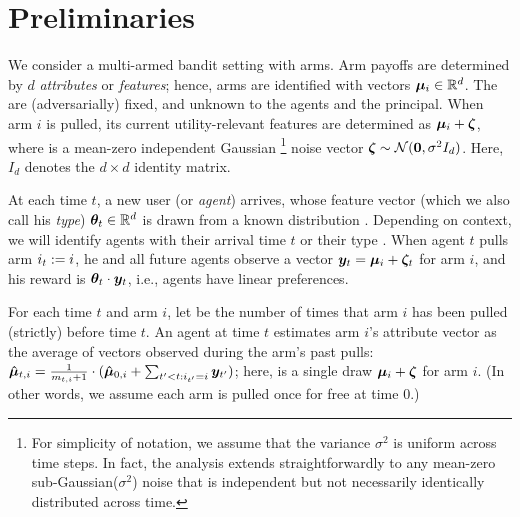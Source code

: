\section{Preliminaries}
\label{sec:prob}

We consider a multi-armed bandit setting with \ARMNUM arms.
Arm payoffs are determined by $d$ \emph{attributes} or \emph{features};
hence, arms are identified with vectors $\ArmV{i} \in \R^d$.
The  are (adversarially) fixed, and unknown to the agents
and the principal.
When arm $i$ is pulled, its current utility-relevant features are
determined as $\ArmV{i} + \NoiseV$, where \NoiseV is a mean-zero independent Gaussian%
\footnote{For simplicity of notation, we assume that the variance
  $\sigma^2$ is uniform across time steps.
In fact, the analysis extends straightforwardly to any
mean-zero sub-Gaussian($\sigma^2$) noise that is independent but not necessarily identically distributed across time.}
noise vector $\NoiseV \sim \Normal{\vc{0}}{\sigma^2 I_{d}}$.
Here, $I_d$ denotes the $d \times d$ identity matrix.

At each time $t$, a new user (or \emph{agent}) arrives,
whose feature vector (which we also call his \emph{type})
$\AgentV{t} \in \R^d$ is drawn from a known distribution \AgentDist.
Depending on context, we will identify agents with their arrival time
$t$ or their type .
When agent $t$ pulls arm $\Pull{t} := i$,
he and all future agents observe a vector
$\ObsV{t} = \ArmV{i} + \NoiseV[t]$ for arm $i$,
and his reward is $\AgentV{t} \cdot \ObsV{t}$,
i.e., agents have linear preferences.

For each time $t$ and arm $i$, let  be the number of
times that arm $i$ has been pulled (strictly) before time $t$.
An agent at time $t$ estimates arm $i$'s attribute vector as the
average of vectors observed during the arm's past pulls:
$\ArmEV{t}{i} = \frac{1}{\NumPull{t}{i}+1} \cdot
(\ArmEV{0}{i} + \sum_{t'<t: \Pull{t'} = i} \ObsV{t'})$;
here,  is a single draw $\ArmV{i} + \NoiseV$ for arm $i$.
(In other words, we assume each arm is pulled once for free at time 0.)
  
